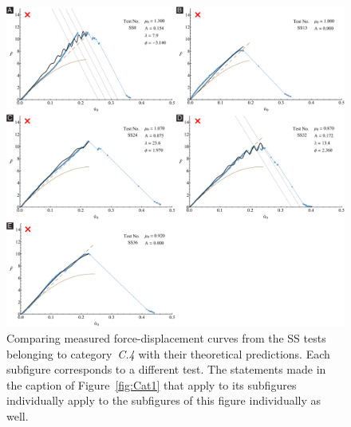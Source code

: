\documentclass[preprint,10pt,times]{elsarticle}
\numberwithin{equation}{section}
\begin{document}
\begin{figure}
\begin{centering}
\includegraphics[width=1\textwidth]{../Figures_Submit/Cat4.pdf}
\par\end{centering}
\centering{}\caption{\label{fig:Cat4}Comparing measured force-displacement curves from the SS tests belonging to category~\textit{C.4} with their theoretical predictions.
Each subfigure corresponds to a different test.
The statements made in the caption of Figure~\ref{fig:Cat1} that apply  to its subfigures individually apply to the subfigures of this figure individually as well.}
\end{figure}


\newpage
 
 
\end{document}
